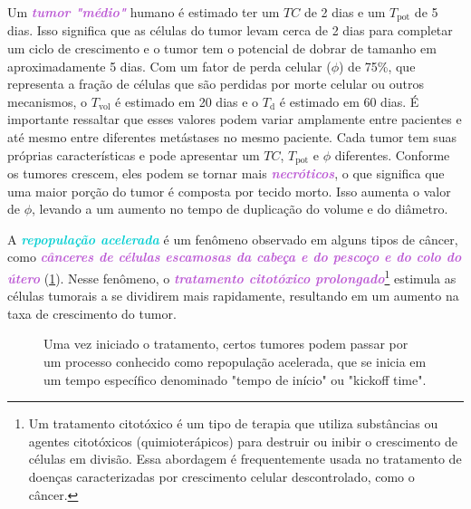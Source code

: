 \documentclass[11pt,a4paper]{article}
\begin{document}
	Um \textcolor{MediumOrchid}{\textbf{\textit{tumor "médio"}}} humano é estimado ter um $TC$ de 2 dias e um $T_{\text{pot}}$ de 5 dias. Isso significa que as células do tumor levam cerca de 2 dias para completar um ciclo de crescimento e o tumor tem o potencial de dobrar de tamanho em aproximadamente 5 dias. Com um fator de perda celular ($\phi$) de 75\%, que representa a fração de células que são perdidas por morte celular ou outros mecanismos, o $T_{\text{vol}}$ é estimado em 20 dias e o $T_{\text{d}}$ é estimado em 60 dias. É importante ressaltar que esses valores podem variar amplamente entre pacientes e até mesmo entre diferentes metástases no mesmo paciente. Cada tumor tem suas próprias características e pode apresentar um $TC$, $T_{\text{pot}}$ e $\phi$ diferentes. Conforme os tumores crescem, eles podem se tornar mais \textcolor{MediumOrchid}{\textbf{\textit{necróticos}}}, o que significa que uma maior porção do tumor é composta por tecido morto. Isso aumenta o valor de $\phi$, levando a um aumento no tempo de duplicação do volume e do diâmetro.

	A \textcolor{DarkTurquoise}{\textbf{\textit{repopulação acelerada}}} é um fenômeno observado em alguns tipos de câncer, como \textcolor{MediumOrchid}{\textbf{\textit{cânceres de células escamosas da cabeça e do pescoço e do colo do útero}}} (\ref{fig:repopulacaoAcelerada}). Nesse fenômeno, o \textcolor{MediumOrchid}{\textbf{\textit{tratamento citotóxico prolongado}}}\footnote{Um tratamento citotóxico é um tipo de terapia que utiliza substâncias ou agentes citotóxicos (quimioterápicos) para destruir ou inibir o crescimento de células em divisão. Essa abordagem é frequentemente usada no tratamento de doenças caracterizadas por crescimento celular descontrolado, como o câncer.} estimula as células tumorais a se dividirem mais rapidamente, resultando em um aumento na taxa de crescimento do tumor.

	\begin{figure}[h]
		\centering
		\caption{Uma vez iniciado o tratamento, certos tumores podem passar por um processo conhecido como repopulação acelerada, que se inicia em um tempo específico denominado "tempo de início" ou "kickoff time".}
		\label{fig:repopulacaoAcelerada}
	\end{figure}
\end{document}

